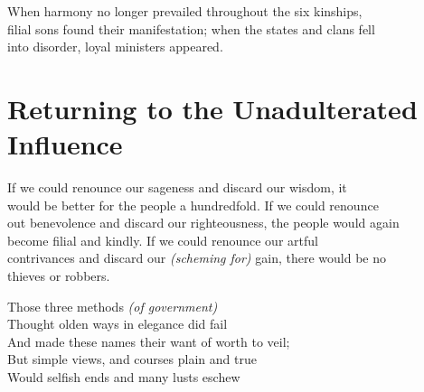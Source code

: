     When harmony no longer prevailed throughout the six kinships,\\
    filial sons found their manifestation; when the states and clans fell\\
    into disorder, loyal ministers appeared.\vspace{\baselineskip}
    
\section*{Returning to the Unadulterated Influence}
    If we could renounce our sageness and discard our wisdom, it\\
    would be better for the people a hundredfold. If we could renounce\\
    out benevolence and discard our righteousness, the people would again\\
    become filial and kindly. If we could renounce our artful\\
    contrivances and discard our \textit{(scheming for)} gain, there would be no\\
    thieves or robbers.\vspace{\baselineskip}
    
    Those three methods \textit{(of government)}\\
    Thought olden ways in elegance did fail\\
    And made these names their want of worth to veil;\\
    But simple views, and courses plain and true\\
    Would selfish ends and many lusts eschew\vspace{\baselineskip}
    
